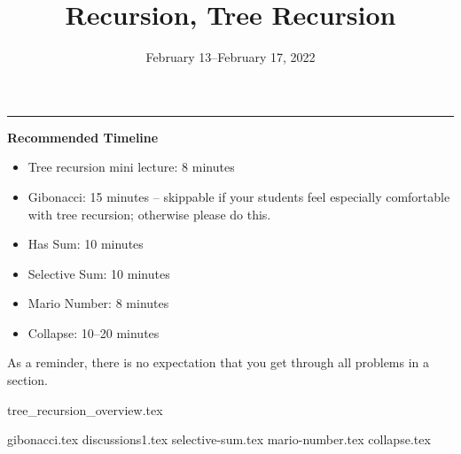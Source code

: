 \documentclass{exam}
\title{Recursion, Tree Recursion}
\date{February 13--February 17, 2022}
\begin{document}
\maketitle
\rule{\textwidth}{0.15em}
\fontsize{12}{15}\selectfont

\begin{meta}
\textbf{Recommended Timeline}
\begin{itemize}
    \item Tree recursion mini lecture: 8 minutes
    \item Gibonacci: 15 minutes -- skippable if your students feel especially comfortable with tree recursion; otherwise please do this.
    \item Has Sum: 10 minutes
    \item Selective Sum: 10 minutes
    \item Mario Number: 8 minutes
    \item Collapse: 10--20 minutes
\end{itemize}
As a reminder, there is no expectation that you get through all problems in a section.
\end{meta}

{tree_recursion_overview.tex}
\begin{questions}
    {gibonacci.tex}
    {discussions1.tex}
    {selective-sum.tex}
    {mario-number.tex}
    {collapse.tex}
\end{questions}
\end{document}
